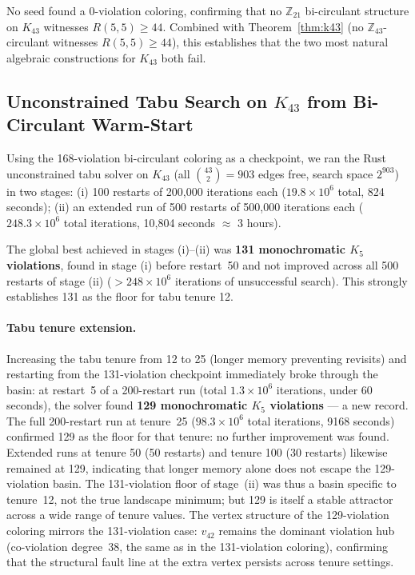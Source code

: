 \documentclass[11pt]{article}
\begin{document}
No seed found a 0-violation coloring, confirming that no $\mathbb{Z}_{21}$
bi-circulant structure on $K_{43}$ witnesses $R(5,5) \geq 44$.
Combined with Theorem~\ref{thm:k43} (no $\mathbb{Z}_{43}$-circulant witnesses
$R(5,5) \geq 44$), this establishes that the two most natural algebraic
constructions for $K_{43}$ both fail.

\subsection{Unconstrained Tabu Search on $K_{43}$ from Bi-Circulant Warm-Start}

Using the 168-violation bi-circulant coloring as a checkpoint, we ran the
Rust unconstrained tabu solver on $K_{43}$ (all $\binom{43}{2}=903$ edges free,
search space $2^{903}$) in two stages:
(i) 100 restarts of 200,000 iterations each ($19.8 \times 10^6$ total, 824 seconds);
(ii) an extended run of 500 restarts of 500,000 iterations each
     ($248.3 \times 10^6$ total iterations, 10,804 seconds $\approx$ 3 hours).

The global best achieved in stages (i)--(ii) was \textbf{131 monochromatic $K_5$ violations},
found in stage (i) before restart~50 and not improved across all 500 restarts
of stage (ii) ($>248\times 10^6$ iterations of unsuccessful search).
This strongly establishes 131 as the floor for tabu tenure 12.

\paragraph{Tabu tenure extension.}
Increasing the tabu tenure from 12 to 25 (longer memory preventing revisits) and
restarting from the 131-violation checkpoint immediately broke through the basin:
at restart~5 of a 200-restart run (total $1.3 \times 10^6$ iterations, under 60 seconds),
the solver found \textbf{129 monochromatic $K_5$ violations} --- a new record.
The full 200-restart run at tenure~25 ($98.3 \times 10^6$ total iterations, 9168 seconds)
confirmed 129 as the floor for that tenure: no further improvement was found.
Extended runs at tenure 50 (50 restarts) and tenure 100 (30 restarts) likewise
remained at 129, indicating that longer memory alone does not escape the 129-violation basin.
The 131-violation floor of stage~(ii) was thus a basin specific to tenure~12,
not the true landscape minimum; but 129 is itself a stable attractor across
a wide range of tenure values.
The vertex structure of the 129-violation coloring
mirrors the 131-violation case: $v_{42}$ remains the dominant violation hub
(co-violation degree~38, the same as in the 131-violation coloring),
confirming that the structural fault line at the extra vertex persists across tenure settings.
\end{document}

